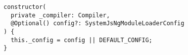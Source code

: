 \begin{verbatim}
  constructor(
    private _compiler: Compiler,
    @Optional() config?: SystemJsNgModuleLoaderConfig
  ) {
    this._config = config || DEFAULT_CONFIG;
  }
\end{verbatim}
